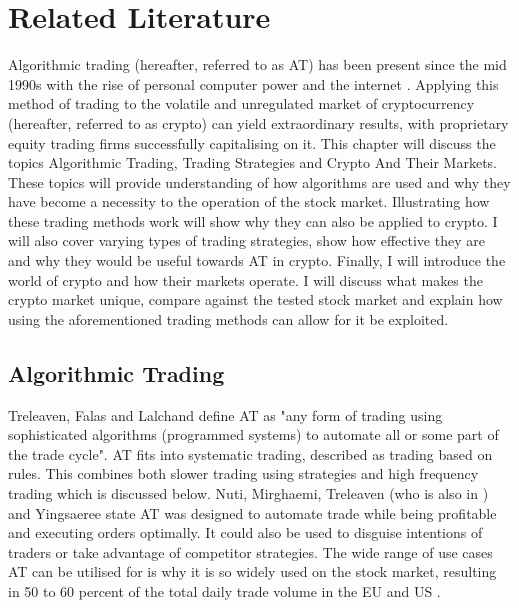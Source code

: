%
\chapter{Related Literature}
\label{sec:related}
Algorithmic trading (hereafter, referred to as AT) has been present since the mid 1990s with the rise of personal computer power and the internet \cite{WEB:PISANI:2010}. Applying this method of trading to the volatile and unregulated market of cryptocurrency (hereafter, referred to as crypto) can yield extraordinary results, with proprietary equity trading firms successfully capitalising on it. This chapter will discuss the topics Algorithmic Trading, Trading Strategies and Crypto And Their Markets. These topics will provide understanding of how algorithms are used and why they have become a necessity to the operation of the stock market. Illustrating how these trading methods work will show why they can also be applied to crypto. I will also cover varying types of trading strategies, show how effective they are and why they would be useful towards AT in crypto. Finally, I will introduce the world of crypto and how their markets operate. I will discuss what makes the crypto market unique, compare against the tested stock market and explain how using the aforementioned trading methods can allow for it be exploited. 


\section{Algorithmic Trading}
\label{sec:related:algoTrading}
\noindent Treleaven, Falas and Lalchand \cite{ART:Treleaven:2013} define AT as "any form of trading using sophisticated algorithms (programmed systems) to automate all or some part of the trade cycle". AT fits into systematic trading, described as trading based on rules. This combines both slower trading using strategies and high frequency trading which is discussed below. Nuti, Mirghaemi, Treleaven (who is also in \cite{ART:Treleaven:2013}) and Yingsaeree \cite{ART:Nuti:2011} state AT was designed to automate trade while being profitable and executing orders optimally. It could also be used to disguise intentions of traders or take advantage of competitor strategies. The wide range of use cases AT can be utilised for is why it is so widely used on the stock market, resulting in 50 to 60 percent of the total daily trade volume in the EU and US \cite{ART:Nuti:2011}.

